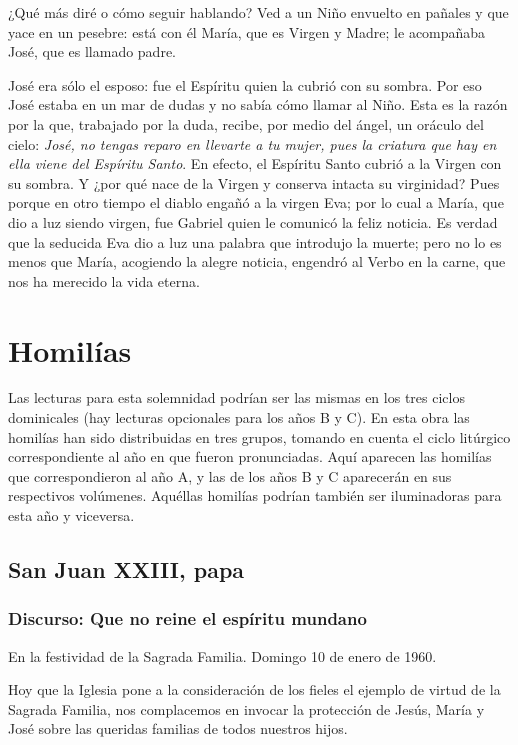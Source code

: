 ¿Qué más diré o cómo seguir hablando? Ved a un Niño envuelto en pañales y que yace en un pesebre: está con él María, que es Virgen y Madre; le acompañaba José, que es llamado padre.

José era sólo el esposo: fue el Espíritu quien la cubrió con su sombra. Por eso José estaba en un mar de dudas y no sabía cómo llamar al Niño. Esta es la razón por la que, trabajado por la duda, recibe, por medio del ángel, un oráculo del cielo: \emph{José, no tengas reparo en llevarte a tu mujer, pues la criatura que hay en ella viene del Espíritu Santo}. En efecto, el Espíritu Santo cubrió a la Virgen con su sombra. Y ¿por qué nace de la Virgen y conserva intacta su virginidad? Pues porque en otro tiempo el diablo engañó a la virgen Eva; por lo cual a María, que dio a luz siendo virgen, fue Gabriel quien le comunicó la feliz noticia. Es verdad que la seducida Eva dio a luz una palabra que introdujo la muerte; pero no lo es menos que María, acogiendo la alegre noticia, engendró al Verbo en la carne, que nos ha merecido la vida eterna.

\section{Homilías}

Las lecturas para esta solemnidad podrían ser las mismas en los tres ciclos dominicales (hay lecturas opcionales para los años B y C). En esta obra las homilías han sido distribuidas en tres grupos, tomando en cuenta el ciclo litúrgico correspondiente al año en que fueron pronunciadas. Aquí aparecen las homilías que correspondieron al año A, y las de los años B y C aparecerán en sus respectivos volúmenes. Aquéllas homilías podrían también ser iluminadoras para esta año y viceversa.

\subsection{San Juan XXIII, papa}

\subsubsection{Discurso: Que no reine el espíritu mundano}

En la festividad de la Sagrada Familia. Domingo 10 de enero de 1960.

Hoy que la Iglesia pone a la consideración de los fieles el ejemplo de virtud de la Sagrada Familia, nos complacemos en invocar la protección de Jesús, María y José sobre las queridas familias de todos nuestros hijos.

